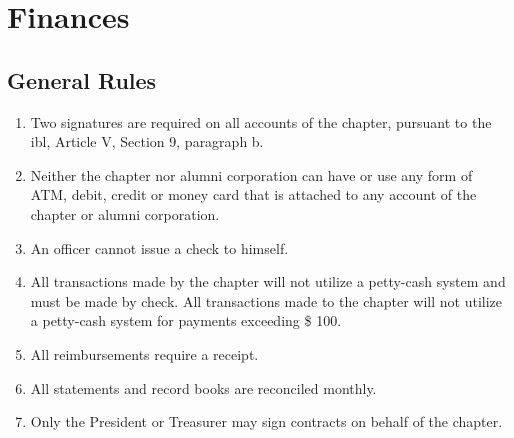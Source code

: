 
\chapter{Finances}


\section{General Rules}
	\label{fin-rules}
	\begin{enumerate}
		\item Two signatures are required on all accounts of the chapter, pursuant to the \gls{ibl}, Article V, Section 9, paragraph b.
		\item Neither the chapter nor alumni corporation can have or use any form of ATM, debit, credit or money card that is attached to any account of the chapter or alumni corporation.
		\item An officer cannot issue a check to himself.
		\item All transactions made by the chapter will not utilize a petty-cash system and must be made by check. All transactions made to the chapter will not utilize a petty-cash system for payments exceeding \$ 100.
		\item All reimbursements require a receipt.
		\item All statements and record books are reconciled monthly.
        \item Only the President or Treasurer may sign contracts on behalf of the chapter.
	\end{enumerate}

